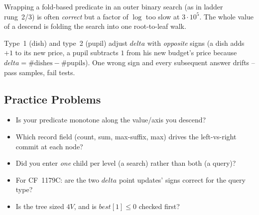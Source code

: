 \begin{warningbox}
Wrapping a fold-based predicate in an outer binary search (as in ladder rung~2/3)
is often \emph{correct} but a factor of \(\log\) too slow at \(3\cdot10^5\).
The whole value of a descend is folding the search into one root-to-leaf walk.
\end{warningbox}

\begin{warningbox}
Type~1 (dish) and type~2 (pupil) adjust \(\mathit{delta}\) with \emph{opposite}
signs (a dish adds \(+1\) to its new price, a pupil subtracts \(1\) from his new
budget's price because \(\mathit{delta}=\#\text{dishes}-\#\text{pupils}\)).  One
wrong sign and every subsequent answer drifts -- pass samples, fail tests.
\end{warningbox}

\subsection{Practice Problems}

\begin{stuckbox}
\begin{itemize}[nosep,leftmargin=1.4em]
  \item Is your predicate monotone along the value/axis you descend?
  \item Which record field (count, sum, max-suffix, max) drives the left-vs-right
        commit at each node?
  \item Did you enter \emph{one} child per level (a search) rather than both (a
        query)?
  \item For CF~1179C: are the two \(\mathit{delta}\) point updates' signs correct
        for the query type?
  \item Is the tree sized \(4V\), and is \(\mathit{best}[1]\le0\) checked first?
\end{itemize}
\end{stuckbox}


